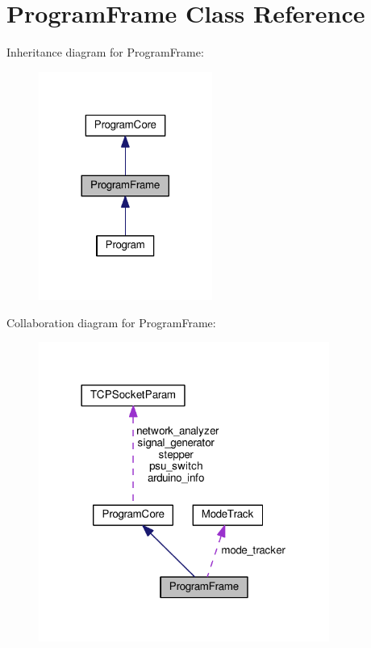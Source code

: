 \hypertarget{class_program_frame}{}\section{Program\+Frame Class Reference}
\label{class_program_frame}


Inheritance diagram for Program\+Frame\+:
\nopagebreak
\begin{figure}[H]
\begin{center}
\leavevmode
\includegraphics[width=161pt]{class_program_frame__inherit__graph}
\end{center}
\end{figure}


Collaboration diagram for Program\+Frame\+:
\nopagebreak
\begin{figure}[H]
\begin{center}
\leavevmode
\includegraphics[width=270pt]{class_program_frame__coll__graph}
\end{center}
\end{figure}
